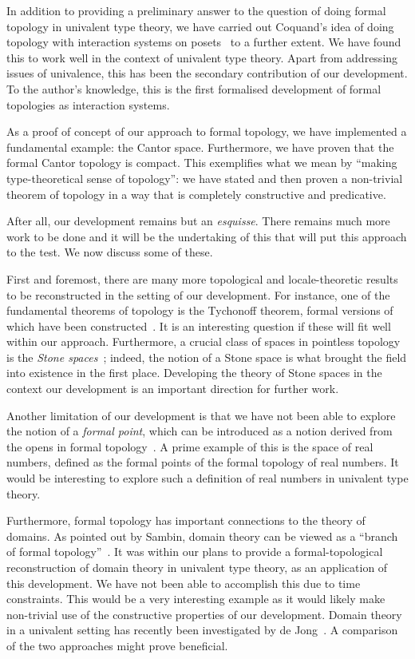 In addition to providing a preliminary answer to the question of doing formal topology in
univalent type theory, we have carried out Coquand's idea of doing topology with
interaction systems on posets~\cite{coq-posets} to a further extent. We have found this to
work well in the context of univalent type theory. Apart from addressing issues of
univalence, this has been the secondary contribution of our development. To the author's
knowledge, this is the first formalised development of formal topologies as interaction
systems.

As a proof of concept of our approach to formal topology, we have implemented a
fundamental example: the Cantor space. Furthermore, we have proven that the formal Cantor
topology is compact. This exemplifies what we mean by ``making type-theoretical sense of
topology'': we have stated and then proven a non-trivial theorem of topology in a way that
is completely constructive and predicative.

After all, our development remains but an \emph{esquisse}. There remains much more work to
be done and it will be the undertaking of this that will put this approach to the test. We
now discuss some of these.

First and foremost, there are many more topological and locale-theoretic results to be
reconstructed in the setting of our development. For instance, one of the fundamental
theorems of topology is the Tychonoff theorem, formal versions of which have been
constructed~\cite{coq-tychonoff, vickers-tychonoff}. It is an interesting question if
these will fit well within our approach. Furthermore, a crucial class of spaces in
pointless topology is the \emph{Stone spaces}~\cite{stone-spaces}; indeed, the notion of a
Stone space is what brought the field into existence in the first place. Developing the
theory of Stone spaces in the context our development is an important direction for
further work.

Another limitation of our development is that we have not been able to explore the notion
of a \emph{formal point}, which can be introduced as a notion derived from the opens in
formal topology~\cite[pg.~94]{coq-sambin}. A prime example of this is the space of real
numbers, defined as the formal points of the formal topology of real numbers. It would be
interesting to explore such a definition of real numbers in univalent type theory.

Furthermore, formal topology has important connections to the theory of domains. As
pointed out by Sambin, domain theory can be viewed as a ``branch of formal
topology''~\cite{sambin-domains}. It was within our plans to provide a formal-topological
reconstruction of domain theory in univalent type theory, as an application of this
development. We have not been able to accomplish this due to time constraints. This would
be a very interesting example as it would likely make non-trivial use of the constructive
properties of our development. Domain theory in a univalent setting has recently been
investigated by de Jong~\cite{de-jong-domains}. A comparison of the two approaches might
prove beneficial.

